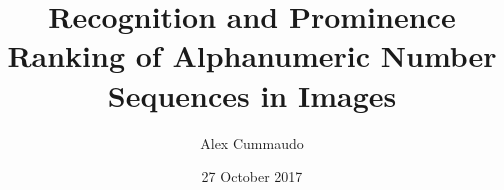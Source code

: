 \title{Recognition and Prominence Ranking of Alphanumeric Number Sequences in Images}
\author{Alex Cummaudo}
\date{27 October 2017}

\def \thesupervisor {Prof. Rajesh Vasa, Assoc. Prof. Andrew Cain}
\def \thedegree {Bachelor of Information Technology (Honours)}
\def \theinstitution {Deakin Software and Technology Innovation Laboratory\\School of Information Technology\\Deakin University, Australia}
\def \theauthorspostnominals {BSc \textit{Swinburne}}